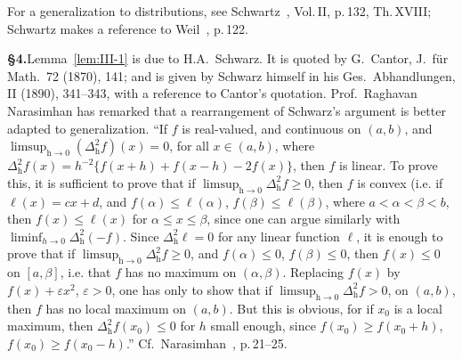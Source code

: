 \noindent For a generalization to distributions, see Schwartz~\cite{schwartz1950}, Vol.\,II, p.\,132, Th.\,XVIII; Schwartz makes a reference to Weil~\cite{weil1940}, p.\,122.

\noindent\textbf{§4.}\quad Lemma~\ref{lem:III-1} is due to H.A.~Schwarz. It is quoted by G.~Cantor, J.~f\"ur Math.~72 (1870), 141; and is given by Schwarz himself in his Ges.~Abhandlungen, II (1890), 341--343, with a reference to Cantor's quotation. Prof.~Raghavan Narasimhan has remarked that a rearrangement of Schwarz's argument is better adapted to generalization. ``If $f$ is real-valued, and continuous on $(a,b)$, and $\limsup_{\mathrm{h}\to0}(\Delta_{\mathrm{h}}^2f)(x)=0$, for all $x\in(a,b)$, where $\Delta_{\mathrm{h}}^2f(x)=h^{-2}\{f(x+h)+f(x-h)-2f(x)\}$, then $f$ is linear. To prove this, it is sufficient to prove that if $\limsup_{\mathrm{h}\to0}\Delta_{\mathrm{h}}^2f\geq0$, then $f$ is convex (i.e. if $\ell(x)=cx+d$, and $f(\alpha)\leq\ell(\alpha)$, $f(\beta)\leq\ell(\beta)$, where $a<\alpha<\beta<b$, then $f(x)\leq\ell(x)$ for $\alpha\leq x\leq\beta$, since one can argue similarly with $\liminf_{h\to0}\Delta_{\mathrm{h}}^2(-f)$. Since $\Delta_{\mathrm{h}}^2\ell=0$ for any linear function $\ell$, it is enough to prove that if $\limsup_{\mathrm{h}\to0}\Delta_{\mathrm{h}}^2f\geq0$, and $f(\alpha)\leq0$, $f(\beta)\leq0$, then $f(x)\leq0$ on $[a,\beta]$, i.e. that $f$ has no maximum on $(\alpha,\beta)$. Replacing $f(x)$ by $f(x)+\varepsilon x^2$, $\varepsilon>0$, one has only to show that if $\limsup_{\mathrm{h}\to0}\Delta_{\mathrm{h}}^2f>0$, on $(a,b)$, then $f$ has no local maximum on $(a,b)$. But this is obvious, for if $x_0$ is a local maximum, then $\Delta_{\mathrm{h}}^2f(x_0)\leq0$ for $h$ small enough, since $f(x_0)\geq f(x_0+h)$, $f(x_0)\geq f(x_0-h)$.'' Cf.~Narasimhan~\cite{narasimhan1985}, p.\,21--25.

